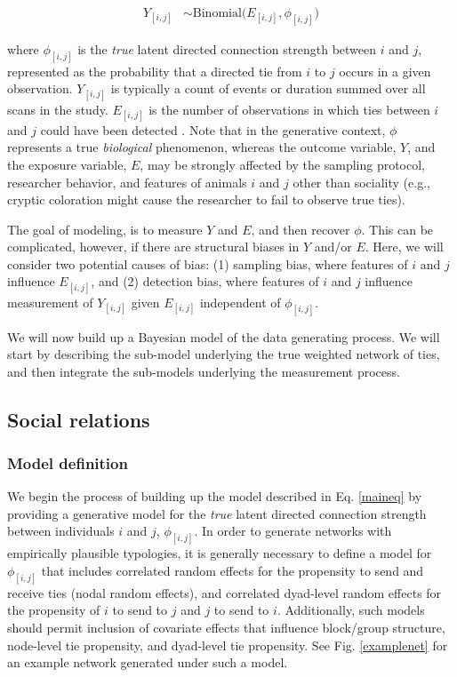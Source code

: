\documentclass[Afour,sageh,times]{sagej}
\begin{document}
\begin{ceqn}
\begin{align}\label{maineq}
	Y_{[i,j]} &\sim \mathrm{Binomial}\Big(E_{[i,j]}, \phi_{[i,j]} \Big)
\end{align}
\end{ceqn}

where $\phi_{[i,j]}$ is the \emph{true} latent directed connection strength between $i$ and $j$, represented as the probability that a directed tie from $i$ to $j$ occurs in a given observation. 
$Y_{[i,j]}$ is typically a count of events or duration summed over all scans in the study. 
$E_{[i,j]}$ is the number of observations in which ties between $i$ and $j$ could have been detected \citep[e.g., the total number of scans or the sum of focals for individuals $i$ and $j$.][]{Farine2015a}. Note that in the generative context, $\phi$ represents a true \emph{biological} phenomenon, whereas the outcome variable, $Y$, and the exposure variable, $E$, may be strongly affected by the sampling protocol, researcher behavior, and features of animals $i$ and $j$ other than sociality (e.g., cryptic coloration might cause the researcher to fail to observe true ties). 

The goal of modeling, is to measure $Y$ and $E$, and then recover $\phi$. This can be complicated, however, if there are structural biases in $Y$ and/or $E$. Here, we will consider two potential causes of bias: (1) sampling bias, where features of $i$ and $j$ influence $E_{[i,j]}$, and (2) detection bias, where features of $i$ and $j$ influence measurement of $Y_{[i,j]}$ given $E_{[i,j]}$ independent of $\phi_{[i,j]}$. 

We will now build up a Bayesian model of the data generating process. We will start by describing the sub-model underlying the true weighted network of ties, and then integrate the sub-models underlying the measurement process.

\subsection{Social relations}
\subsubsection{Model definition}

We begin the process of building up the model described in Eq. \ref{maineq} by providing a generative model for the \emph{true} latent directed connection strength between individuals $i$ and $j$, $\phi_{[i,j]}$. In order to generate  networks with empirically plausible typologies, it is generally necessary to define a model for $\phi_{[i,j]}$ that includes correlated random effects for the propensity to send and receive ties (nodal random effects), and correlated dyad-level random effects for the propensity of $i$ to send to $j$ and $j$ to send to $i$. Additionally, such models should permit inclusion of covariate effects that influence block/group structure, node-level tie propensity, and dyad-level tie propensity. See Fig. \ref{examplenet} for an example network generated under such a model.
\end{document}
